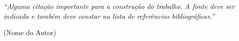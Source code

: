 \thispagestyle{empty} %

\vspace*{\fill} %

\begin{flushright}
    \begin{minipage}{.5\textwidth} %
        \begin{OnehalfSpacing} %
            \textit{“Alguma citação importante para a construção do trabalho. A fonte deve ser indicada e também deve constar na lista de referências bibliográficas.”}
            
            \vspace{1em}
            (Nome do Autor) %
        \end{OnehalfSpacing}
    \end{minipage}
\end{flushright}